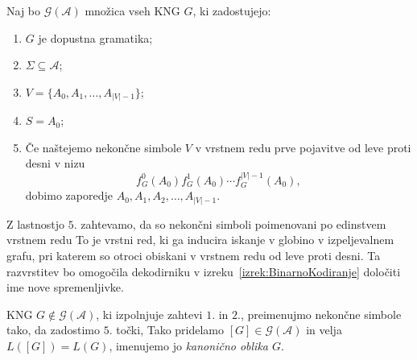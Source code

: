 \documentclass[fin1, tisk]{fmfdelo}
\providecommand{\abs}[1]{\left\lvert #1 \right\rvert}
\newcommand{\A}{\mathcal{A}}
\newcommand{\G}{\mathcal{G}}
\theoremstyle{definition}
\begin{document}
\begin{definicija}\label{def:G(A)} 
    Naj bo $\G(\A)$ množica vseh KNG $G$, ki zadostujejo:
    \begin{enumerate}
        \item $G$ je dopustna gramatika;
        \item $\Sigma \subseteq \A$;
        \item $V = \{ A_0, A_1, \ldots, A_{\abs{V}-1} \}$;
        \item $S=A_0$;
        \item Če naštejemo nekončne simbole $V$ v vrstnem redu prve pojavitve od leve proti desni
        v nizu
        \[
            f_G^0(A_0)f_G^1(A_0) \cdots f_G^{\abs{V}-1}(A_0),
        \]
        dobimo zaporedje $A_0, A_1, A_2, \ldots, A_{\abs{V}-1}$.
    \end{enumerate}
    Z lastnostjo $5.$ zahtevamo, da so nekončni simboli poimenovani po edinstvem vrstnem redu To 
    je vrstni red, ki ga inducira iskanje v globino v izpeljevalnem grafu, pri katerem so otroci
    obiskani v vrstnem redu od leve proti desni. Ta razvrstitev bo omogočila dekodirniku v 
    izreku~\ref{izrek:BinarnoKodiranje} določiti ime nove spremenljivke.

KNG $G \notin \G(\A)$, ki izpolnjuje zahtevi $1.$ in $2.$, preimenujmo nekončne simbole tako, da
zadostimo $5.$ točki, Tako pridelamo $[G] \in \G(\A)$ in velja $L([G]) = L(G)$, 
imenujemo jo \emph{kanonično oblika $G$}.
\end{definicija}
\end{document}
